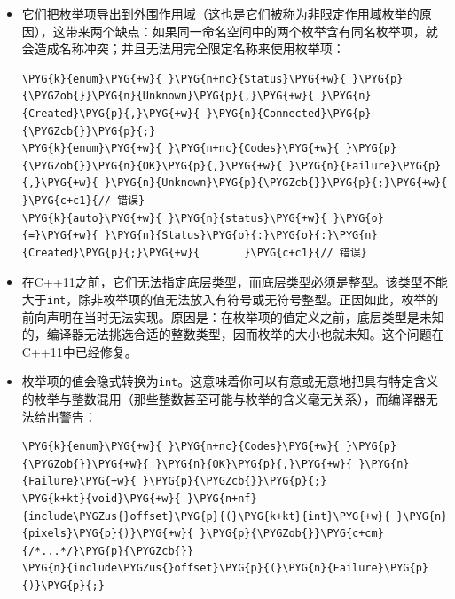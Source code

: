 \begin{itemize}
\item 它们把枚举项导出到外围作用域（这也是它们被称为非限定作用域枚举的原因），这带来两个缺点：如果同一命名空间中的两个枚举含有同名枚举项，就会造成名称冲突；并且无法用完全限定名称来使用枚举项：



\begin{codeblockbg}
\begin{Verbatim}[commandchars=\\\{\},breaklines=true,breakanywhere=true,fontsize=\codefont,xleftmargin=17bp]
\PYG{k}{enum}\PYG{+w}{ }\PYG{n+nc}{Status}\PYG{+w}{ }\PYG{p}{\PYGZob{}}\PYG{n}{Unknown}\PYG{p}{,}\PYG{+w}{ }\PYG{n}{Created}\PYG{p}{,}\PYG{+w}{ }\PYG{n}{Connected}\PYG{p}{\PYGZcb{}}\PYG{p}{;}
\PYG{k}{enum}\PYG{+w}{ }\PYG{n+nc}{Codes}\PYG{+w}{ }\PYG{p}{\PYGZob{}}\PYG{n}{OK}\PYG{p}{,}\PYG{+w}{ }\PYG{n}{Failure}\PYG{p}{,}\PYG{+w}{ }\PYG{n}{Unknown}\PYG{p}{\PYGZcb{}}\PYG{p}{;}\PYG{+w}{   }\PYG{c+c1}{// 错误}
\PYG{k}{auto}\PYG{+w}{ }\PYG{n}{status}\PYG{+w}{ }\PYG{o}{=}\PYG{+w}{ }\PYG{n}{Status}\PYG{o}{:}\PYG{o}{:}\PYG{n}{Created}\PYG{p}{;}\PYG{+w}{       }\PYG{c+c1}{// 错误}
\end{Verbatim}
\end{codeblockbg}



\item 在C++11之前，它们无法指定底层类型，而底层类型必须是整型。该类型不能大于\texttt{int}，除非枚举项的值无法放入有符号或无符号整型。正因如此，枚举的前向声明在当时无法实现。原因是：在枚举项的值定义之前，底层类型是未知的，编译器无法挑选合适的整数类型，因而枚举的大小也就未知。这个问题在C++11中已经修复。



\item 枚举项的值会隐式转换为\texttt{int}。这意味着你可以有意或无意地把具有特定含义的枚举与整数混用（那些整数甚至可能与枚举的含义毫无关系），而编译器无法给出警告：



\begin{codeblockbg}
\begin{Verbatim}[commandchars=\\\{\},breaklines=true,breakanywhere=true,fontsize=\codefont,xleftmargin=17bp]
\PYG{k}{enum}\PYG{+w}{ }\PYG{n+nc}{Codes}\PYG{+w}{ }\PYG{p}{\PYGZob{}}\PYG{+w}{ }\PYG{n}{OK}\PYG{p}{,}\PYG{+w}{ }\PYG{n}{Failure}\PYG{+w}{ }\PYG{p}{\PYGZcb{}}\PYG{p}{;}
\PYG{k+kt}{void}\PYG{+w}{ }\PYG{n+nf}{include\PYGZus{}offset}\PYG{p}{(}\PYG{k+kt}{int}\PYG{+w}{ }\PYG{n}{pixels}\PYG{p}{)}\PYG{+w}{ }\PYG{p}{\PYGZob{}}\PYG{c+cm}{/*...*/}\PYG{p}{\PYGZcb{}}
\PYG{n}{include\PYGZus{}offset}\PYG{p}{(}\PYG{n}{Failure}\PYG{p}{)}\PYG{p}{;}
\end{Verbatim}
\end{codeblockbg}

\end{itemize}


